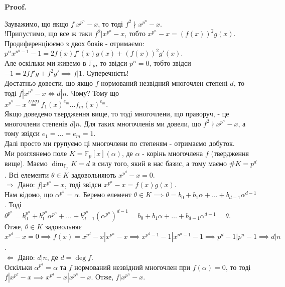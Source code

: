 \documentclass[a4paper, 10pt]{article}
\makeatletter
\theoremstyle{theoremdd}
\theoremstyle{theoremdd}
\theoremstyle{theoremdd}
\theoremstyle{theoremdd}
\theoremstyle{theoremdd}
\theoremstyle{theoremdd}
\theoremstyle{theoremdd}
\theoremstyle{theoremdd}
\def\rightproof{$\boxed{\Rightarrow}$ }
\def\leftproof{$\boxed{\Leftarrow}$ }
\renewenvironment{proof}[1][Proof.\\]{\par
\pushQED{\hfill \qed}%
\normalfont \topsep6\p@\@plus6\p@\relax
\trivlist
\item\relax
{\bfseries
#1\@addpunct{.}}\hspace\labelsep\ignorespaces
}{%
\popQED\endtrivlist\@endpefalse
}
\makeatother
\begin{document}
\begin{proof}
Зауважимо, що якщо $f | x^{p^n} - x$, то тоді $f^2 \nmid x^{p^n} - x$.\\
!Припустимо, що все ж таки $f^2 | x^{p^n} - x$, тобто $x^{p^n} - x = (f(x))^2 g(x)$. Продиференціюємо з двох боків - отримаємо:\\
$p^n x^{p^n-1} - 1 = 2f(x)f'(x)g(x) + (f(x))^2g'(x)$.\\
Але оскільки ми живемо в $\mathbb{F}_p$, то звідси $p^n = 0$, тобто звідси\\
$-1 = 2ff'g + f^2g' \implies f | 1$. Суперечність!
\bigskip \\
Достатньо довести, що якщо $f$ нормований незвідний многочлен степені $d$, то тоді $f | x^{p^n} - x \iff d | n$. Чому? Тому що\\
$x^{p^n} - x \overset{UFD}{=} f_1(x)^{e_m} \dots f_m(x)^{e_m}$.\\
Якщо доведемо твердження вище, то тоді многочлени, що праворуч, - це многочлени степенів $d | n$. Для таких многочленів ми довели, що $f^2 \nmid x^{p^n} - x$, а тому звідси $e_1 = \dots = e_m = 1$.\\
Далі просто ми групуємо ці многочлени по степеням - отримаємо добуток.
\bigskip \\
Ми розглянемо поле $K = \mathbb{F}_p[x](\alpha)$, де $\alpha$ - корінь многочлена $f$ (твердження вище). Маємо $\dim_{\mathbb{F}_p} K = d$ в силу того, який в нас базис, а тому маємо $\# K = p^d$. Всі елементи $\theta \in K$ задовольняють $x^{p^d} - x =0$.
\bigskip \\
\rightproof Дано: $f | x^{p^n} - x$, тоді звідси $x^{p^n} - x = f(x)g(x)$.\\
Нам відомо, що $\alpha^{p^n} = \alpha$. Беремо елемент $\theta \in K \implies \theta = b_0 + b_1 \alpha + \dots + b_{d-1} \alpha^{d-1}$. Тоді\\
$\theta^{p^n} = b_0^{p^n} + b_1^{p^n} \alpha^{p^n} + \dots + b_{d-1}^{p^n} (\alpha^{p^n})^{d-1} = b_0 + b_1 \alpha + \dots + b_{d-1} \alpha^{d-1} = \theta$.\\
Отже, $\theta \in K$ задовольняє $x^{p^d} - x =0 \implies f(x) = x^{p^d} - x | x^{p^n} - x \implies x^{p^d-1}-1 | x^{p^n-1}-1 \implies p^d-1 | p^n - 1 \implies d|n$.\\
\leftproof Дано: $d | n$, де $d = \deg f$.\\
Оскільки $\alpha^{p^d} = \alpha$ та $f$ нормований незвідний многочлен при $f(\alpha) = 0$, то тоді $f | x^{p^d} - x \implies x^{p^d} - x | x^{p^n} - x$. Отже, $f | x^{p^n}-x$.
\end{proof}
\end{document}
